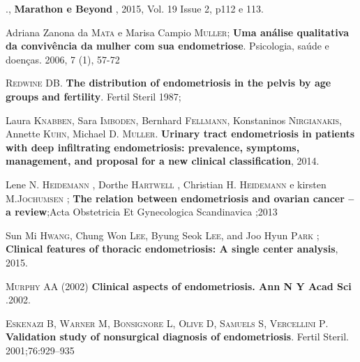\documentclass[12pt]{article} %
\begin{document}
\vspace{0,5cm}

., \textbf{Marathon e Beyond }, 2015, Vol. 19 Issue 2, p112 e 113.

\vspace{0,5cm}

Adriana Zanona da \textsc{Mata} e Marisa Campio \textsc{Muller};\textbf{ Uma análise qualitativa da convivência da mulher com sua endometriose}. Psicologia, saúde e doenças. 2006, 7 (1), 57-72

\vspace{0,5cm}

\textsc{Redwine DB}.\textbf{ The distribution of endometriosis in the pelvis by age groups and fertility}. Fertil Steril 1987; 

\vspace{0,5cm}

Laura \textsc{Knabben}, Sara \textsc{Imboden}, Bernhard \textsc{Fellmann}, Konstaninos \textsc{Nirgianakis}, Annette \textsc{Kuhn}, Michael D.\textsc{ Muller}. \textbf{Urinary tract endometriosis in patients with deep infiltrating endometriosis: prevalence, symptoms, management, and proposal for a new clinical classification}, 2014.

\vspace{0,5cm}

Lene N. \textsc{Heidemann} , Dorthe \textsc{Hartwell} , Christian H. \textsc{Heidemann} e kirsten M.\textsc{Jochumsen} ; \textbf{The relation between endometriosis and ovarian cancer – a review};Acta Obstetricia Et Gynecologica Scandinavica ;2013

\vspace{0,5cm}

Sun Mi\textsc{ Hwang}, Chung Won \textsc{Lee}, Byung Seok\textsc{ Lee}, and Joo Hyun \textsc{Park} ;\textbf{ Clinical features of thoracic endometriosis: A single center analysis}, 2015.

\vspace{0,5cm}

\textsc{Murphy AA} (2002) \textbf{Clinical aspects of endometriosis. Ann N Y Acad Sci} .2002.

\vspace{0,5cm}

\textsc{Eskenazi B, Warner M, Bonsignore L, Olive D, Samuels S, Vercellini P}. \textbf{Validation study of nonsurgical diagnosis of endometriosis}. Fertil Steril. 2001;76:929–935

\vspace{0,5cm}
\end{document}
